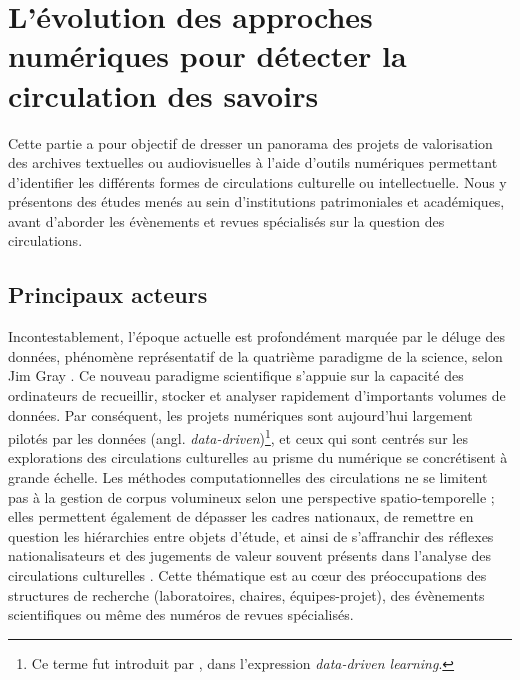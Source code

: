 \chapter{L’évolution des approches numériques pour détecter la circulation des savoirs}
\minitoc
\label{sect:sota_circulations}
Cette partie a pour objectif de dresser un panorama des projets de valorisation des archives textuelles ou audiovisuelles à l'aide d'outils numériques permettant d'identifier les différents formes de circulations culturelle ou intellectuelle. Nous y présentons des études menés au sein d'institutions patrimoniales et académiques, avant d'aborder les évènements et revues spécialisés sur la question des circulations.
\section{Principaux acteurs}
\label{sect:sota_acteurs} Incontestablement, l'époque actuelle est profondément marquée par le \og{}déluge des données\fg{}, phénomène représentatif de la quatrième paradigme de la science, selon Jim Gray \citep[p.~30]{hey2009jim}. Ce nouveau paradigme scientifique s'appuie sur la capacité des ordinateurs de recueillir, stocker et analyser rapidement d'importants volumes de données. Par conséquent, les projets numériques sont aujourd'hui largement \og{}pilotés par les données (angl. \textit{data-driven})\fg{}\footnote{Ce terme fut introduit par \citet{Johns1991ShouldYB}, dans l'expression \textit{data-driven learning}.}, et ceux qui sont centrés sur les explorations des circulations culturelles au prisme du numérique se concrétisent à grande échelle. Les méthodes computationnelles des circulations ne se limitent pas à la gestion de corpus volumineux selon une perspective spatio-temporelle ; elles permettent également de dépasser les cadres nationaux, de remettre en question les hiérarchies entre objets d’étude, et ainsi de s'affranchir des \og{}réflexes nationalisateurs\fg{} et des \og{}jugements de valeur\fg{} souvent présents dans l'analyse des circulations culturelles \citep[p.~12]{joyeux2022circulations}.
Cette thématique est au c\oe{}ur des préoccupations des structures de recherche (laboratoires, chaires, équipes-projet), des évènements scientifiques ou même des numéros de revues spécialisés.

